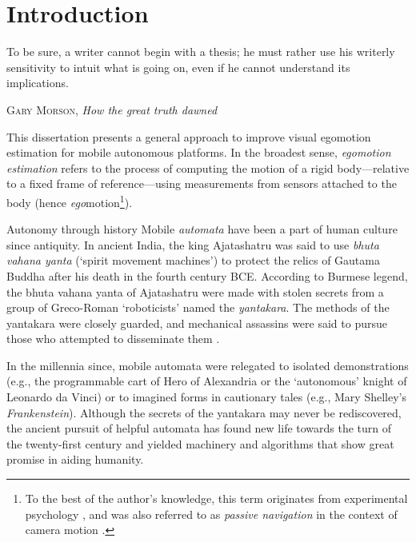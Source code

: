 \chapter{Introduction}
\label{ch:intro}
\epigraph{To be sure, a writer cannot begin with a thesis; he must rather use his writerly sensitivity to intuit what is going on, even if he cannot understand its implications.}{\textsc{Gary Morson}, \textit{How the great truth dawned}}
 





This dissertation presents a general approach to improve visual egomotion estimation for mobile autonomous platforms.  In the broadest sense, \textit{egomotion estimation} refers to the process of computing the motion of a rigid body---relative to a fixed frame of reference---using measurements from sensors attached to the body (hence \textit{ego}motion\footnote{To the best of the author's knowledge, this term originates from experimental psychology \citep{warren1976perception}, and was also referred to as \textit{passive navigation} in the context of camera motion \citep{bruss_passive_1983}.}).  
\begin{remark}{Autonomy through history}
Mobile \textit{automata} have been a part of human culture since antiquity. In ancient India, the king Ajatashatru was said to use \textit{bhuta vahana yanta} (`spirit movement machines') to protect the relics of Gautama Buddha after his death in the fourth century BCE. According to Burmese legend, the bhuta vahana yanta of Ajatashatru were made with stolen secrets from a group of Greco-Roman `roboticists' named the \textit{yantakara}. The methods of the yantakara were closely guarded, and mechanical assassins were said to pursue those who attempted to disseminate them \citep{MayorGodsRobots2019}.

In the millennia since, mobile automata were relegated to isolated demonstrations (e.g., the programmable cart of Hero of Alexandria or the `autonomous' knight of Leonardo da Vinci) or to imagined forms in cautionary tales (e.g., Mary Shelley's \textit{Frankenstein}). Although the secrets of the yantakara may never be rediscovered, the ancient pursuit of helpful automata has found new life towards the turn of the twenty-first century and yielded machinery and algorithms that show great promise in aiding humanity.
\end{remark}
 
